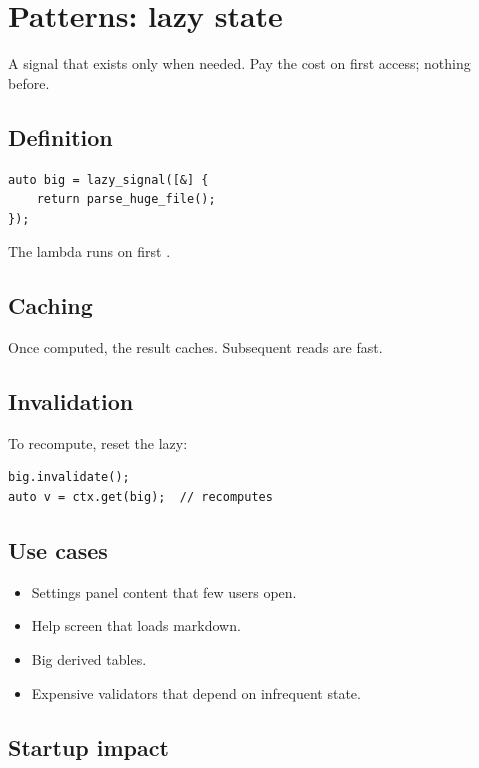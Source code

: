 \chapter{Patterns: lazy state}
\label{ch:lazystate}

\begin{aside}
A signal that exists only when needed. Pay the cost on first
access; nothing before.
\end{aside}

\section{Definition}

\begin{lstlisting}
auto big = lazy_signal([&] {
    return parse_huge_file();
});
\end{lstlisting}

The lambda runs on first .

\section{Caching}

Once computed, the result caches. Subsequent reads are
fast.

\section{Invalidation}

To recompute, reset the lazy:

\begin{lstlisting}
big.invalidate();
auto v = ctx.get(big);  // recomputes
\end{lstlisting}

\section{Use cases}

\begin{itemize}[leftmargin=*]
  \item Settings panel content that few users open.
  \item Help screen that loads markdown.
  \item Big derived tables.
  \item Expensive validators that depend on infrequent
    state.
\end{itemize}

\section{Startup impact}

